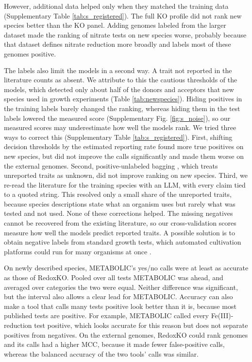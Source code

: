 \documentclass[10pt,a4paper,onecolumn]{article}
\begin{document}
However, additional data helped only when they matched the training data
(Supplementary Table \ref{tab:s_registered}). The full KO profile did
not rank new species better than the KO panel. Adding genomes labeled
from the larger dataset made the ranking of nitrate tests on new species
worse, probably because that dataset defines nitrate reduction more
broadly and labels most of these genomes positive.

The labels also limit the models in a second way. A trait not reported
in the literature counts as absent. We attribute to this the cautious
thresholds of the models, which detected only about half of the donors
and acceptors that new species used in growth experiments (Table
\ref{tab:newspecies}). Hiding positives in the training labels barely
changed the ranking, whereas hiding them in the test labels lowered the
measured score (Supplementary Fig. \ref{fig:s_noise}), so our measured
scores may underestimate how well the models rank. We tried three ways
to correct this (Supplementary Table \ref{tab:s_registered}). First,
shifting decision thresholds by the estimated reporting rate found more
true positives on new species, but did not improve the calls
significantly and made them worse on the external genomes. Second,
positive-unlabeled bagging \autocite{Mordelet2014}, which treats
unreported traits as unknown, did not improve ranking on new species.
Third, we re-read the literature for the training species with an LLM,
with every claim tied to a quoted string. This resolved only a small
share of the unreported traits, because species descriptions state what
an organism uses but rarely what was tested and not used. None of these
corrections helped. The missing negatives cannot be recovered from the
existing literature, so our cross-validation scores measure how well the
models predict reported traits. A possible solution is to obtain
negative labels from standard growth tests, which automated cultivation
platforms could run for many organisms at once \autocite{Huang2023}.

On newly described species, METABOLIC's yes/no calls were at least as
accurate as those of RedoxKO. Pooled over all tests METABOLIC was ahead,
and averaged over categories the two were equal. Neither difference was
significant, but the interval also allows a clear lead for METABOLIC.
Accuracy can also make a tool that calls many tests positive look better
than it is, because most published tests are positive. For example,
METABOLIC called every Fe(III)-reduction test positive, which looks
accurate for this reason but does not separate positives from negatives.
On the external genomes, RedoxKO could rank genomes and its calls had a
higher MCC, because it made fewer false-positive calls, whereas the
balanced accuracy of the two tools' calls was similar.
\end{document}
